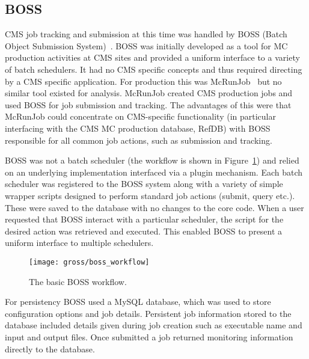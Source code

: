 \subsection{BOSS}
CMS job tracking and submission at this time was handled by BOSS (Batch Object Submission System)~\cite{citeulike:342741}. BOSS was initially developed as a tool for MC production activities at CMS sites and provided a uniform interface to a variety of batch schedulers. It had no CMS specific concepts and thus required directing by a CMS specific application. For production this was McRunJob~\cite{citeulike:867593} but no similar tool existed for analysis. McRunJob created CMS production jobs and used BOSS for job submission and tracking. The advantages of this were that McRunJob could concentrate on CMS-specific functionality (in particular interfacing with the CMS MC production database, RefDB) with BOSS responsible for all common job actions, such as submission and tracking.

BOSS was not a batch scheduler (the workflow is shown in Figure~\ref{fig:boss_Workflow}) and relied on an underlying implementation interfaced via a plugin mechanism. Each batch scheduler was registered to the BOSS system along with a variety of simple wrapper scripts designed to perform standard job actions (submit, query etc.). These were saved to the database with no changes to the core code. When a user requested that BOSS interact with a particular scheduler, the script for the desired action was retrieved and executed. This enabled BOSS to present a uniform interface to multiple schedulers.

\begin{figure}[tbp]
  \centering
  \texttt{[image: gross/boss\_workflow]}
  \caption{The basic BOSS workflow.~\cite{citeulike:342741}
  \label{fig:boss_Workflow}}
\end{figure}

For persistency BOSS used a MySQL database, which was used to store configuration options and job details. Persistent job information stored to the database included details given during job creation such as executable name and input and output files. Once submitted a job returned monitoring information directly to the database. 

